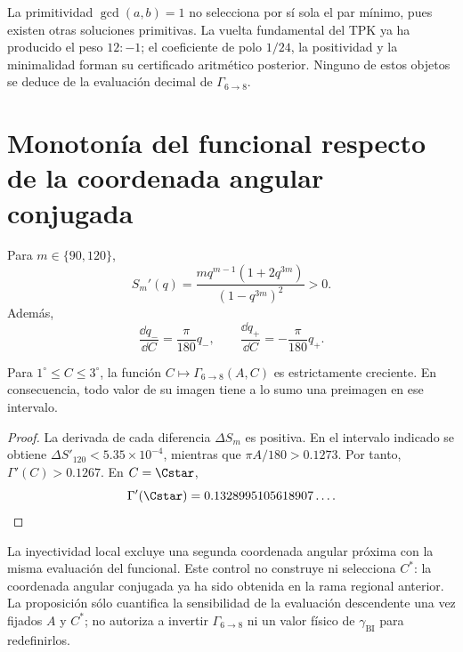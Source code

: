 La primitividad \(\gcd(a,b)=1\) no selecciona por sí sola el par mínimo, pues
existen otras soluciones primitivas. La vuelta fundamental del TPK ya ha
producido el peso \(12:-1\); el coeficiente de polo \(1/24\), la positividad y la
minimalidad forman su certificado aritmético posterior. Ninguno de estos
objetos se deduce de la evaluación decimal de \(\Gamma_{6\to8}\).

\newpage
\section{Monotonía del funcional respecto de la coordenada angular conjugada}

Para \(m\in\{90,120\}\),
\[
 S_m'(q)=\frac{m q^{m-1}(1+2q^{3m})}{(1-q^{3m})^2}>0.
\]
Además,
\[
 \frac{\dd q_-}{\dd C}=\frac\pi{180}q_-,
 \qquad
 \frac{\dd q_+}{\dd C}=-\frac\pi{180}q_+.
\]

\begin{proposition}
Para \(1^\circ\leq C\leq3^\circ\), la función
\(C\mapsto\Gamma_{6\to8}(A,C)\) es estrictamente creciente. En consecuencia,
todo valor de su imagen tiene a lo sumo una preimagen en ese intervalo.
\end{proposition}
\begin{proof}
La derivada de cada diferencia \(\Delta S_m\) es positiva. En el intervalo
indicado se obtiene
\(\Delta S'_{120}<5.35\times10^{-4}\), mientras que
\(\pi A/180>0.1273\). Por tanto,
\(\Gamma'(C)>0.1267\). En \(C=\Cstar\),
\[
 \Gamma'(\Cstar)=0.1328995105618907\ldots.
\]
\end{proof}

La inyectividad local excluye una segunda coordenada angular próxima con la
misma evaluación del funcional. Este control no construye ni selecciona
\(C^*\): la coordenada angular conjugada ya ha sido obtenida en la rama regional anterior.
La proposición sólo cuantifica la sensibilidad de la evaluación descendente
una vez fijados \(A\) y \(C^*\); no autoriza a invertir
\(\Gamma_{6\to8}\) ni un valor físico de \(\gamma_{\mathrm{BI}}\) para
redefinirlos.
